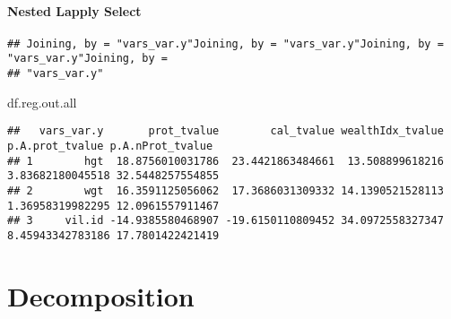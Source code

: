 \documentclass[
]{book}
\newenvironment{Shaded}{\begin{snugshade}}{\end{snugshade}}
\newcommand{\ControlFlowTok}[1]{\textcolor[rgb]{0.13,0.29,0.53}{\textbf{#1}}}
\newcommand{\DataTypeTok}[1]{\textcolor[rgb]{0.13,0.29,0.53}{#1}}
\newcommand{\KeywordTok}[1]{\textcolor[rgb]{0.13,0.29,0.53}{\textbf{#1}}}
\newcommand{\NormalTok}[1]{#1}
\newcommand{\OperatorTok}[1]{\textcolor[rgb]{0.81,0.36,0.00}{\textbf{#1}}}
\newcommand{\StringTok}[1]{\textcolor[rgb]{0.31,0.60,0.02}{#1}}
\begin{document}
\hypertarget{nested-lapply-select}{%
\paragraph{Nested Lapply Select}\label{nested-lapply-select}}

\begin{Shaded}
\end{Shaded}

\begin{verbatim}
## Joining, by = "vars_var.y"Joining, by = "vars_var.y"Joining, by = "vars_var.y"Joining, by =
## "vars_var.y"
\end{verbatim}

\begin{Shaded}
\begin{Highlighting}[]
\NormalTok{df.reg.out.all}
\end{Highlighting}
\end{Shaded}

\begin{verbatim}
##   vars_var.y       prot_tvalue        cal_tvalue wealthIdx_tvalue  p.A.prot_tvalue p.A.nProt_tvalue
## 1        hgt  18.8756010031786  23.4421863484661  13.508899618216 3.83682180045518 32.5448257554855
## 2        wgt  16.3591125056062  17.3686031309332 14.1390521528113 1.36958319982295 12.0961557911467
## 3     vil.id -14.9385580468907 -19.6150110809452 34.0972558327347 8.45943342783186 17.7801422421419
\end{verbatim}

\hypertarget{decomposition}{%
\section{Decomposition}\label{decomposition}}
\end{document}
